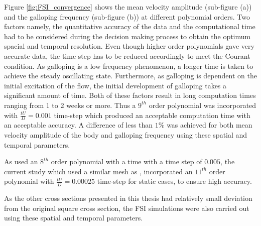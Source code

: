 Figure \ref{fig:FSI_convergence} shows the mean velocity amplitude (sub-figure (a)) and the galloping frequency (sub-figure (b)) at different polynomial orders. Two factors namely, the quantitative accuracy of the data and the computational time had to be considered during the decision making process to obtain the optimum spacial and temporal resolution. Even though higher order polynomials gave very accurate data, the time step has to be reduced accordingly to meet the Courant condition. As galloping is a low frequency phenomenon, a longer time is taken to achieve the steady oscillating state. Furthermore, as galloping is dependent on the initial excitation of the flow, the initial development of galloping takes a significant amount of time. Both of these factors result in long computation times ranging from 1 to 2 weeks or more. Thus a $9^{th}$ order polynomial was incorporated with $\frac{tU}{D}=0.001$ time-step which produced an acceptable computation time with an acceptable accuracy. A difference of less than $1\%$ was achieved for both mean velocity amplitude  of the body and galloping frequency using these spatial and temporal parameters.

As \citet{Leontini2013}  used an $8^{th}$ order polynomial with a time with a time step of $0.005$, the current study which used a similar mesh as \citet{Leontini2013}, incorporated an $11^{th}$ order polynomial with $\frac{tU}{D}=0.00025$ time-step for static cases, to ensure high accuracy.

As the other cross sections presented in this thesis had relatively small deviation from the original square cross section, the FSI simulations were also carried out using these spatial and temporal parameters.     















